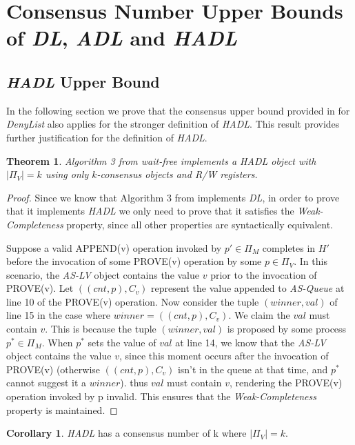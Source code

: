 \documentclass[11pt]{article}
\newtheorem{theorem}{Theorem}
\theoremstyle{definition}
\newtheorem{corollary}{Corollary}
\begin{document}
\section{Consensus Number Upper Bounds of \textit{DL}, \textit{ADL} and \textit{HADL}}
\subsection{\textit{HADL} Upper Bound}
In the following section we prove that the consensus upper bound provided in \cite{AccessControl} for \textit{DenyList} also applies for the stronger definition of \textit{HADL}. This result provides further justification for the definition of \textit{HADL}.

\begin{theorem}
\label{thm:HADLUpperBound}
    Algorithm 3 from \cite{AccessControl} wait-free implements a \textit{HADL} object with $\vert\Pi_V\vert=k$ using only $k$-consensus objects and R/W registers.
\end{theorem}

\begin{proof}
    Since we know that Algorithm 3 from \cite{AccessControl} implements \textit{DL}, in order to prove that it implements \textit{HADL} we only need to prove that it satisfies the \textit{Weak-Completeness} property, since all other properties are syntactically equivalent. 
    
    Suppose a valid \mbox{APPEND}(v) operation invoked by $p'\in\Pi_M$ completes in $H'$ before the invocation of some  \mbox{PROVE}(v) operation by some $p\in \Pi_V$. In this scenario, the \textit{AS-LV} object contains the value $v$ prior to the invocation of PROVE(v). Let $((cnt,p),C_v)$ represent the value appended to \textit{AS-Queue} at line 10 of the PROVE(v) operation.
    Now consider the tuple $(winner,val)$ of line 15 in the case where $winner=((cnt,p),C_v)$. We claim the $val$ must contain $v$. This is because the tuple $(winner,val)$ is proposed by some process $p^*\in\Pi_M$. When $p^*$ sets the value of $val$ at line 14, we know that the \textit{AS-LV} object contains the value $v$, since this moment occurs after the invocation of \mbox{PROVE}(v) (otherwise $((cnt,p),C_v)$ isn't in the queue at that time, and $p^*$ cannot suggest it a $winner$). thus $val$ must contain $v$, rendering the PROVE(v) operation invoked by p invalid. This ensures that the \textit{Weak-Completeness} property is maintained.
\end{proof}

\begin{corollary}
\textit{HADL} has a consensus number of k where $\vert\Pi_V\vert = k$.
\end{corollary}
\end{document}
